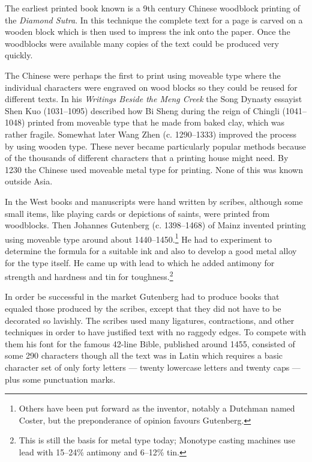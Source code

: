 \documentclass[10pt,letterpaper,extrafontsizes]{memoir}
\begin{document}
    The earliest printed book known is a 9th century Chinese woodblock
printing of the \emph{Diamond Sutra}. In this technique the complete text
for a page is carved on a wooden block which is then used to impress
the ink onto the paper. Once the woodblocks were available many copies 
of the text could be produced very quickly.

    The Chinese were perhaps the first to print using moveable 
type where 
the individual characters were engraved on wood blocks so they could be 
reused for different texts. In his \emph{Writings Beside the Meng Creek}
the Song Dynasty essayist Shen Kuo (1031--1095) 
described how Bi Sheng during the reign of 
Chingli (1041--1048) printed
from moveable type that he made from baked clay, which was rather fragile.
Somewhat later Wang Zhen (c. 1290--1333) improved the 
process by using
wooden type. These never became particularly popular methods because 
of the thousands of different characters that a printing house might need.
By 1230 the Chinese used moveable metal type for printing. None of this was 
known outside Asia.

    In the West books and manuscripts were hand written by scribes, 
although some
small items, like playing cards or depictions of saints, were printed
from woodblocks. Then Johannes Gutenberg 
(c. 1398--1468) of Mainz invented printing using moveable type 
around about 1440--1450.\footnote{Others have been put forward as the 
inventor, notably a Dutchman named Coster, but the preponderance of 
opinion favours Gutenberg.}
 He had to experiment to determine the formula for
a suitable ink and also to develop a good metal alloy 
for the type itself.
He came up with lead to which he added antimony for strength and hardness and
tin for toughness.\footnote{This is still the basis for metal type today;
Monotype casting machines use lead with 15--24\% antimony and 6--12\% tin.}

    In order be successful in the market Gutenberg had to produce books
that equaled those produced by the scribes, except that they did not
have to be decorated so lavishly. The scribes used many ligatures,
contractions, and other techniques in order to have justified text with
no raggedy edges. To compete with them his font for the famous 42-line 
Bible, published around 1455, consisted of some 290 characters though all
the text was in Latin which requires a basic character set of only forty 
letters --- twenty lowercase letters and twenty caps --- plus
some punctuation marks.
\end{document}
